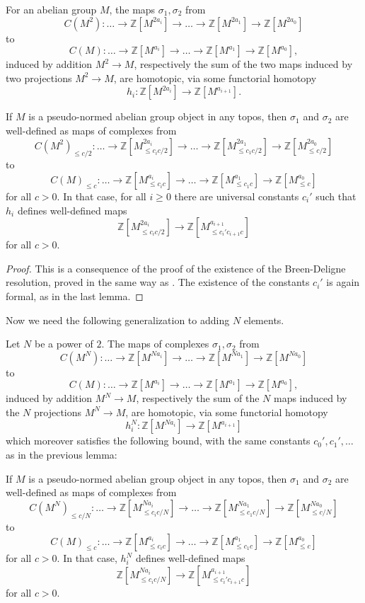 \begin{lemma}\label{lem:basehomotopy} For an abelian group $M$, the maps $\sigma_1,\sigma_2$ from
\[
C(M^2): \ldots \to \mathbb Z[M^{2a_i}]\to\ldots\to\mathbb Z[M^{2a_1}]\to\mathbb Z[M^{2a_0}]
\]
to
\[
C(M): \ldots \to \mathbb Z[M^{a_i}]\to\ldots\to\mathbb Z[M^{a_1}]\to\mathbb Z[M^{a_0}],
\]
induced by addition $M^2\to M$, respectively the sum of the two maps induced by two projections $M^2\to M$, are homotopic, via some functorial homotopy
\[
h_i: \mathbb Z[M^{2a_i}]\to \mathbb Z[M^{a_{i+1}}].
\]

If $M$ is a pseudo-normed abelian group object in any topos, then $\sigma_1$ and $\sigma_2$ are well-defined as maps of complexes from
\[
C(M^2)_{\leq c/2}: \ldots \to \mathbb Z[M^{2a_i}_{\leq c_ic/2}]\to\ldots\to\mathbb
Z[M^{2a_1}_{\leq c_1c/2}]\to\mathbb Z[M^{2a_0}_{\leq c/2}]
\]
to
\[
C(M)_{\leq c}: \ldots \to \mathbb Z[M^{a_i}_{\leq c_ic}]\to\ldots\to\mathbb
Z[M^{a_1}_{\leq c_1c}]\to\mathbb Z[M^{a_0}_{\leq c}]
\]
for all $c>0$. In that case, for all $i\geq 0$ there are universal constants $c_i'$ such that $h_i$ defines well-defined maps
\[
\mathbb Z[M^{2a_i}_{\leq c_ic/2}]\to \mathbb Z[M^{a_{i+1}}_{\leq
c_i'c_{i+1}c}]
\]
for all $c>0$.
\end{lemma}

\begin{proof} This is a consequence of the proof of the existence of the Breen-Deligne resolution, proved in the same way as \cite[Proposition 4.17]{Condensed}. The existence of the constants $c_i'$ is again formal, as in the last lemma.
\end{proof}

Now we need the following generalization to adding $N$ elements.

\begin{lemma}\label{lem:homotopyNelements} Let $N$ be a power of $2$. The maps of complexes $\sigma_1,\sigma_2$ from
\[
C(M^N): \ldots \to \mathbb Z[M^{Na_i}]\to\ldots\to\mathbb Z[M^{Na_1}]\to\mathbb Z[M^{Na_0}]
\]
to
\[
C(M): \ldots \to \mathbb Z[M^{a_i}]\to\ldots\to\mathbb Z[M^{a_1}]\to\mathbb Z[M^{a_0}],
\]
induced by addition $M^N\to M$, respectively the sum of the $N$ maps induced by the $N$ projections $M^N\to M$, are homotopic, via some functorial homotopy
\[
h_i^N: \mathbb Z[M^{Na_i}]\to \mathbb Z[M^{a_{i+1}}]
\]
which moreover satisfies the following bound, with the same constants $c_0',c_1',\ldots$ as in the previous lemma:

If $M$ is a pseudo-normed abelian group object in any topos, then $\sigma_1$ and $\sigma_2$ are well-defined as maps of complexes from
\[
C(M^N)_{\leq c/N}: \ldots \to \mathbb Z[M^{Na_i}_{\leq c_ic/N}]\to\ldots\to\mathbb Z[M^{Na_1}_{\leq c_1c/N}]\to\mathbb Z[M^{Na_0}_{\leq c/N}]
\]
to
\[
C(M)_{\leq c}: \ldots \to \mathbb Z[M^{a_i}_{\leq c_ic}]\to\ldots\to\mathbb Z[M^{a_1}_{\leq c_1c}]\to\mathbb Z[M^{a_0}_{\leq c}]
\]
for all $c>0$. In that case, $h_i^N$ defines well-defined maps
\[
\mathbb Z[M^{Na_i}_{\leq c_ic/N}]\to \mathbb Z[M^{a_{i+1}}_{\leq c_i'c_{i+1}c}]
\]
for all $c>0$.
\end{lemma}

